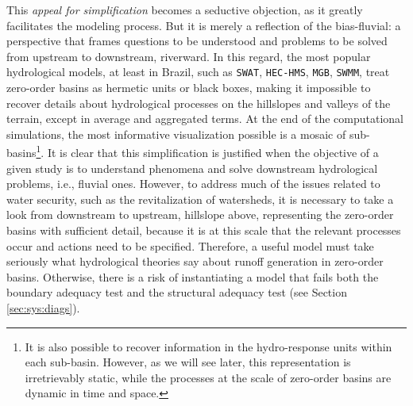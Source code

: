 \documentclass[./main_en.tex]{subfiles}
\begin{document}
\par This \textit{appeal for simplification} becomes a seductive objection, as it greatly facilitates the modeling process. But it is merely a reflection of the \gls{bias-fluvial}: a perspective that frames questions to be understood and problems to be solved from upstream to downstream, riverward. In this regard, the most popular hydrological models, at least in Brazil, such as \texttt{SWAT}, \texttt{HEC-HMS}, \texttt{MGB}, \texttt{SWMM}, treat zero-order basins as hermetic units or black boxes, making it impossible to recover details about hydrological processes on the hillslopes and valleys of the terrain, except in average and aggregated terms. At the end of the computational simulations, the most informative visualization possible is a mosaic of sub-basins\footnote{It is also possible to recover information in the \gls{hydro-response} units within each sub-basin. However, as we will see later, this representation is irretrievably static, while the processes at the scale of zero-order basins are dynamic in time and space.}. It is clear that this simplification is justified when the objective of a given study is to understand phenomena and solve downstream hydrological problems, i.e., fluvial ones. However, to address much of the issues related to water security, such as the revitalization of watersheds, it is necessary to take a look from downstream to upstream, hillslope above, representing the zero-order basins with sufficient detail, because it is at this scale that the relevant processes occur and actions need to be specified. Therefore, a useful \gls{model} must take seriously what hydrological theories say about runoff generation in zero-order basins. Otherwise, there is a risk of instantiating a \gls{model} that fails both the boundary adequacy test and the structural adequacy test (see Section \ref{sec:sys:diags}).
\end{document}
